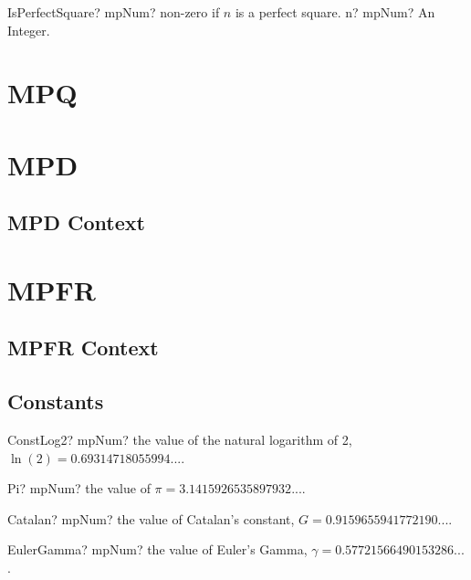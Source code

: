 \documentclass[12pt,a4paper,openany]{book}
\begin{document}
\begin{mpFunctionsExtract}
\mpFunctionOne
{IsPerfectSquare? mpNum? non-zero if $n$ is a perfect square.}
{n? mpNum? An Integer.}
\end{mpFunctionsExtract}

\chapter{MPQ}

\chapter{MPD}

\section{MPD Context}

\chapter{MPFR}

\section{MPFR Context}

\section{Constants}

\begin{mpFunctionsExtract}
\mpFunctionZero
{ConstLog2? mpNum? the value of the natural logarithm of 2, $\ln(2) = 0.69314718055994...$.}
\end{mpFunctionsExtract}

\begin{mpFunctionsExtract}
\mpFunctionZero
{Pi? mpNum? the value of $\pi = 3.1415926535897932...$.}
\end{mpFunctionsExtract}

\begin{mpFunctionsExtract}
\mpFunctionZero
{Catalan? mpNum? the value of Catalan's constant, $G = 0.9159655941772190...$.}
\end{mpFunctionsExtract}

\begin{mpFunctionsExtract}
\mpFunctionZero
{EulerGamma? mpNum? the value of Euler's Gamma, $\gamma = 0.57721566490153286...$.}
\end{mpFunctionsExtract}
\end{document}
